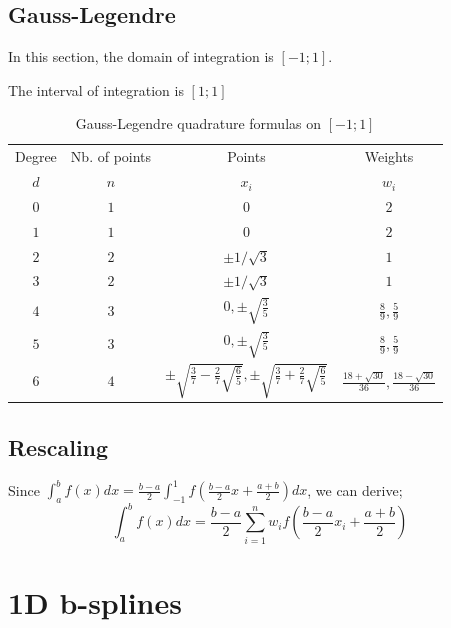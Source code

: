 \documentclass[paper=a4, fontsize=11pt]{scrartcl}
\numberwithin{equation}{section}		%
\numberwithin{figure}{section}			%
\numberwithin{table}{section}				%
\begin{document}
\subsection{Gauss-Legendre}

In this section, the domain of integration is $[-1;1]$.

\begin{table}[hbtp]
\caption{\label{Tab:11Form}Gauss-Legendre quadrature formulas on $[-1;1]$}
\centering
\scriptsize The interval of integration is $[1;1]$\\
\centering
\begin{tabular}{@{}cccc}
\hline
Degree & Nb. of points & Points & Weights\\
$d$ & $n$ & $x_i$ & $w_i$\\
\hline
$0$ & $1$ & $0$ & $2$ \\
$1$ & $1$ & $0$ & $2$ \\
$2$ & $2$ & $\pm 1/\sqrt{3}$ & $1$ \\
$3$ & $2$ & $\pm 1/\sqrt{3}$ & $1$ \\
$4$ & $3$ & $0, \pm \sqrt{\frac{3}{5}}$ & $\frac{8}{9}, \frac{5}{9}$ \\
$5$ & $3$ & $0, \pm \sqrt{\frac{3}{5}}$ & $\frac{8}{9}, \frac{5}{9}$ \\
$6$ & $4$ & $\pm \sqrt{\frac{3}{7} - \frac{2}{7}\sqrt{\frac{6}{5}}}, \pm \sqrt{\frac{3}{7} + \frac{2}{7}\sqrt{\frac{6}{5}}}$ & $\frac{18+\sqrt{30}}{36}, \frac{18-\sqrt{30}}{36}$ \\
\hline
\end{tabular}
\end{table}



\subsection{Rescaling}

Since $\int_a^b f(x)dx = \frac{b-a}{2}\int_{-1}^1 f\left(\frac{b-a}{2}x + \frac{a+b}{2}\right)dx$, we can derive;
$$
\int_a^b f(x)dx = \frac{b-a}{2}\sum_{i=1}^n w_if\left(\frac{b-a}{2}x_i + \frac{a+b}{2}\right)
$$




\newpage
\section{1D b-splines}
\end{document}

